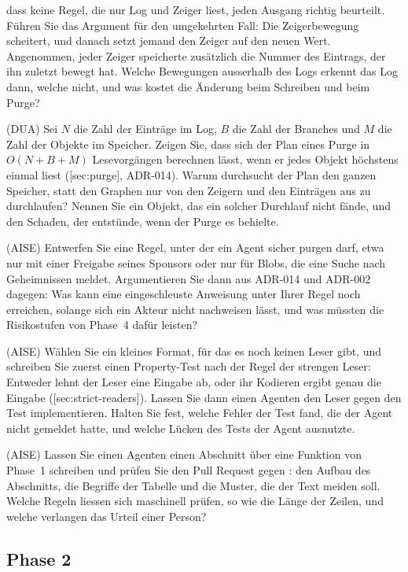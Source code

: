 dass keine Regel, die nur Log und Zeiger liest, jeden Ausgang richtig beurteilt.
Führen Sie das Argument für den umgekehrten Fall:
Die Zeigerbewegung scheitert, und danach setzt jemand den Zeiger auf den neuen Wert.
Angenommen, jeder Zeiger speicherte zusätzlich die Nummer des Eintrags,
der ihn zuletzt bewegt hat.
Welche Bewegungen ausserhalb des Logs erkennt das Log dann, welche nicht,
und was kostet die Änderung beim Schreiben und beim Purge?
\item (DUA) Sei $N$ die Zahl der Einträge im Log, $B$ die Zahl der Branches
und $M$ die Zahl der Objekte im Speicher.
Zeigen Sie, dass sich der Plan eines Purge in $O(N + B + M)$ Lesevorgängen berechnen lässt,
wenn er jedes Objekt höchstens einmal liest
([sec:purge], ADR-014).
Warum durchsucht der Plan den ganzen Speicher, statt den Graphen nur von den Zeigern
und den Einträgen aus zu durchlaufen?
Nennen Sie ein Objekt, das ein solcher Durchlauf nicht fände, und den Schaden,
der entstünde, wenn der Purge es behielte.
\item (AISE) Entwerfen Sie eine Regel, unter der ein Agent sicher purgen darf,
etwa nur mit einer Freigabe seines Sponsors oder nur für Blobs, die eine Suche nach Geheimnissen
meldet.
Argumentieren Sie dann aus ADR-014 und ADR-002 dagegen:
Was kann eine eingeschleuste Anweisung unter Ihrer Regel noch erreichen,
solange sich ein Akteur nicht nachweisen lässt,
und was müssten die Risikostufen von Phase~4 dafür leisten?
\item (AISE) Wählen Sie ein kleines Format, für das es noch keinen Leser gibt,
und schreiben Sie zuerst einen Property-Test nach der Regel der strengen Leser:
Entweder lehnt der Leser eine Eingabe ab, oder ihr Kodieren ergibt genau die Eingabe
([sec:strict-readers]).
Lassen Sie dann einen Agenten den Leser gegen den Test implementieren.
Halten Sie fest, welche Fehler der Test fand, die der Agent nicht gemeldet hatte,
und welche Lücken des Tests der Agent ausnutzte.
\item (AISE) Lassen Sie einen Agenten einen Abschnitt über eine Funktion von Phase~1 schreiben
und prüfen Sie den Pull Request gegen :
den Aufbau des Abschnitts, die Begriffe der Tabelle und die Muster, die der Text meiden soll.
Welche Regeln liessen sich maschinell prüfen, so wie  die Länge der Zeilen,
und welche verlangen das Urteil einer Person?
\stopitemize

\subsection{Phase 2}

